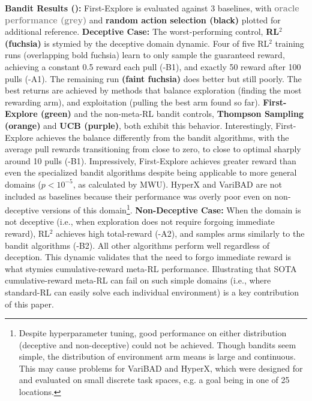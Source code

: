 \documentclass{article}
\begin{document}
\textbf{Bandit Results ():} First-Explore is evaluated against 3 baselines, with \textcolor{gray}{\textbf{oracle performance (grey)}} and
\textbf{random action selection (black)} plotted for additional reference.
\textbf{Deceptive Case:} The worst-performing control, \textcolor{rl2}{\textbf{RL\(^2\) \citep{rl2, rl2alt}  (fuchsia)}} is stymied by the deceptive domain dynamic. Four of five RL\(^2\) training runs (overlapping bold fuchsia) learn to only sample the guaranteed reward, achieving a constant 0.5 reward each pull (-B1), and exactly 50 reward after 100 pulls (-A1). The remaining run \textbf{\textcolor{faintf}{(faint fuchsia)}} does better but still poorly.
The best returns are achieved by methods that balance exploration (finding the most rewarding arm), and exploitation (pulling the best arm found so far).
\textcolor{fe}{\textbf{First-Explore (green)}} and the non-meta-RL bandit controls, \textcolor{ts}{\textbf{Thompson Sampling \citep{TS} (orange)}} and \textcolor{ucb}{\textbf{UCB \citep{rl2} (purple)}}, both exhibit this behavior. Interestingly, First-Explore achieves the balance differently from the bandit algorithms, with the average pull rewards transitioning from close to zero, to close to optimal sharply around 10 pulls (-B1). Impressively, First-Explore achieves greater reward than even the specialized bandit algorithms despite being applicable to more general domains (\(p < 10^{-5}\), as calculated by MWU). HyperX and VariBAD are not included as baselines because their performance was overly poor even on non-deceptive versions of this domain\footnote{Despite hyperparameter tuning, good performance on either distribution (deceptive and non-deceptive) could not be achieved. Though bandits seem simple, the distribution of environment arm means is large and continuous. This may cause problems for VariBAD and HyperX, which were designed for and evaluated on small discrete task spaces, e.g. a goal being in one of 25 locations.}.
\textbf{Non-Deceptive Case:} When the domain is not deceptive (i.e., when exploration does not require forgoing immediate reward), RL\(^2\) achieves high total-reward (-A2), and samples arms similarly to the bandit algorithms (-B2). All other algorithms perform well regardless of deception. This dynamic validates that the need to forgo immediate reward is what stymies cumulative-reward meta-RL performance.
Illustrating that SOTA cumulative-reward meta-RL can fail on such simple domains (i.e., where standard-RL can easily solve each individual environment) is a key contribution of this paper.
\end{document}
